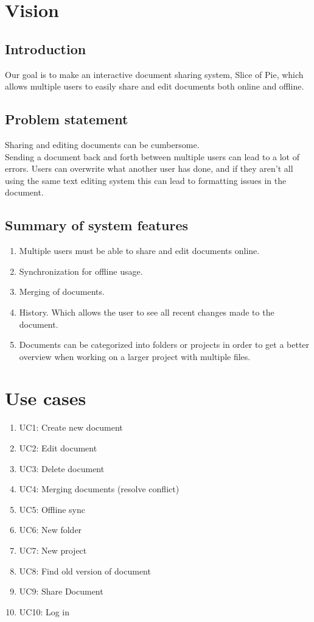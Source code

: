 \documentclass[11pt,a4paper]{article}
\begin{document}
\tableofcontents
\newpage

\section{Vision}
\subsection{Introduction}
Our goal is to make an interactive document sharing system, Slice of Pie,  which allows multiple users to easily share and edit documents both online and offline.
\subsection{Problem statement}
Sharing and editing documents can be cumbersome. \\
Sending a document back and forth between multiple users can lead to a lot of errors. Users can overwrite what another user has done, and if they aren't all using the same text editing system this can lead to formatting issues in the document.
\subsection{Summary of system features}
\begin{enumerate}
\item Multiple users must be able to share and edit documents online.
\item Synchronization for offline usage.
\item Merging of documents.
\item History. Which allows the user to see all recent changes made to the document.
\item Documents can be categorized into folders or projects in order to get a better overview when working on a larger project with multiple files.
\end{enumerate}

\section{Use cases}
\begin{enumerate}
\item UC1: Create new document
\item UC2: Edit document
\item UC3: Delete document
\item UC4: Merging documents (resolve conflict)
\item UC5: Offline sync
\item UC6: New folder
\item UC7: New project
\item UC8: Find old version of document
\item UC9: Share Document
\item UC10: Log in
\end{enumerate}
\end{document}
